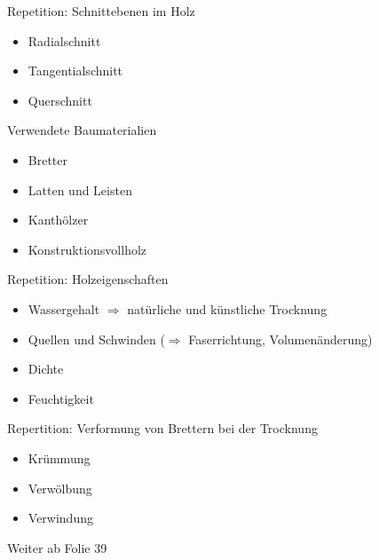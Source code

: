 \begin{frame}{Repetition: Schnittebenen im Holz}

	\begin{itemize}
		\item [\textbullet] Radialschnitt
		\item [\textbullet] Tangentialschnitt
		\item [\textbullet] Querschnitt
	\end{itemize}
\end{frame}

\begin{frame}{Verwendete Baumaterialien}

	\begin{itemize}
		\item [\textbullet] Bretter
		\item [\textbullet] Latten und Leisten
		\item [\textbullet] Kanthölzer
		\item [\textbullet] Konstruktionsvollholz
	\end{itemize}

\end{frame}

\begin{frame}{Repetition: Holzeigenschaften}
	
	\begin{itemize}
		\item [\textbullet] Wassergehalt $\Rightarrow$  natürliche und künstliche Trocknung
		\item [\textbullet] Quellen und Schwinden ($\Rightarrow$ Faserrichtung, Volumenänderung)
		\item [\textbullet] Dichte
		\item [\textbullet] Feuchtigkeit
	\end{itemize}
\end{frame}

\begin{frame}{Repertition: Verformung von Brettern bei der Trocknung}
	\begin{itemize}
		\item [\textbullet] Krümmung
		\item [\textbullet] Verwölbung
		\item [\textbullet] Verwindung
	\end{itemize}

\end{frame}

\begin{frame}{Weiter ab Folie 39}

\end{frame}






